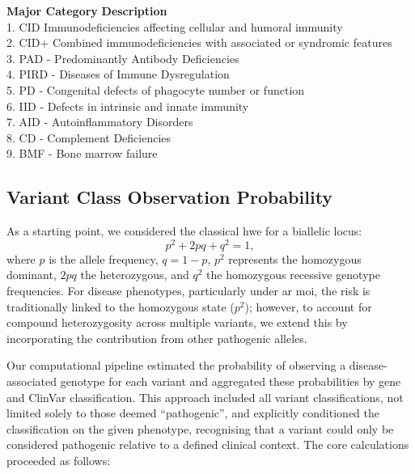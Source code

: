 \begin{tcolorbox}[colback=black!01, colframe=black!70, title=Box \ref{box:definitions} Definitions for IEI Major Disease Categories, label=box:definitions]
\textbf{Major Category} \hspace{4em} \textbf{Description}\\[5pt]
1. CID  Immunodeficiencies affecting cellular and humoral immunity\\[2pt]
2. CID+  Combined immunodeficiencies with associated or syndromic features\\[2pt]
3. PAD - Predominantly Antibody Deficiencies\\[2pt]
4. PIRD - Diseases of Immune Dysregulation\\[2pt]
5. PD - Congenital defects of phagocyte number or function\\[2pt]
6. IID - Defects in intrinsic and innate immunity\\[2pt]
7. AID - Autoinflammatory Disorders\\[2pt]
8. CD - Complement Deficiencies\\[2pt]
9. BMF - Bone marrow failure
\end{tcolorbox}

\subsection{Variant Class Observation Probability}
As a starting point, we considered the classical \ac{hwe} for a biallelic locus:
\[
p^2 + 2pq + q^2 = 1,
\]
where \(p\) is the allele frequency, \(q = 1 - p\), \(p^2\) represents the homozygous dominant, \(2pq\) the heterozygous, and \(q^2\) the homozygous recessive genotype frequencies. For disease phenotypes, particularly under \ac{ar} \ac{moi}, the risk is traditionally linked to the homozygous state (\(p^2\)); however, to account for compound heterozygosity across multiple variants, we extend this by incorporating the contribution from other pathogenic alleles.

Our computational pipeline estimated the probability of observing a disease-associated genotype for each variant and aggregated these probabilities by gene and ClinVar classification. This approach included all variant classifications, not limited solely to those deemed ``pathogenic'', and explicitly conditioned the classification on the given phenotype, recognising that a variant could only be considered pathogenic relative to a defined clinical context. The core calculations proceeded as follows:

